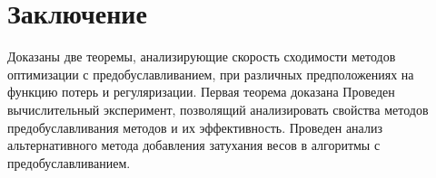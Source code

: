 \section{Заключение}
Доказаны две теоремы, анализирующие скорость сходимости методов оптимизации с предобуславливанием, при различных предположениях на функцию потерь и регуляризации.
Первая теорема доказана 
Проведен вычислительный эксперимент, позволящий анализировать свойства
методов предобуславливания методов и их эффективность.
Проведен анализ альтернативного метода добавления затухания весов в алгоритмы с предобуславливанием.